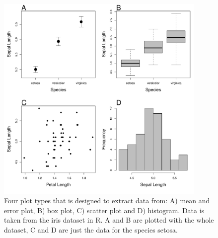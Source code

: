 \documentclass[article]{jss}
\begin{document}
\begin{figure}[b!] 
 \includegraphics[width=0.9\textwidth]{fig_plot_type.pdf} 
 \caption{Four plot types that  is designed to extract data from: A) mean and error plot, B) box plot, C) scatter plot and D) histogram. Data is taken from the iris dataset in R. A and B are plotted with the whole dataset, C and D are just the data for the species setosa.}
\label{fig:plot_type}
\end{figure}
\end{document}
